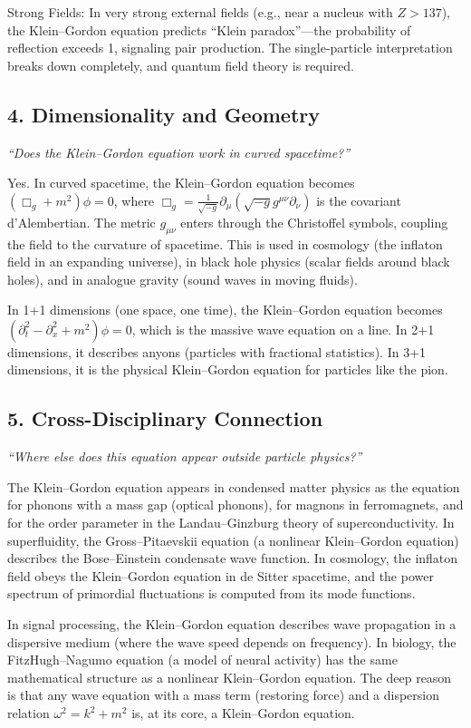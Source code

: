 \documentclass[11pt,openright]{book}
\begin{document}
Strong Fields: In very strong external fields (e.g., near a nucleus with $Z > 137$), the Klein--Gordon equation predicts ``Klein paradox''---the probability of reflection exceeds 1, signaling pair production. The single-particle interpretation breaks down completely, and quantum field theory is required.

\subsection*{4. Dimensionality and Geometry}
\textit{``Does the Klein--Gordon equation work in curved spacetime?''}

Yes. In curved spacetime, the Klein--Gordon equation becomes $(\Box_g + m^2)\phi = 0$, where $\Box_g = \frac{1}{\sqrt{-g}}\partial_\mu(\sqrt{-g}g^{\mu\nu}\partial_\nu)$ is the covariant d'Alembertian. The metric $g_{\mu\nu}$ enters through the Christoffel symbols, coupling the field to the curvature of spacetime. This is used in cosmology (the inflaton field in an expanding universe), in black hole physics (scalar fields around black holes), and in analogue gravity (sound waves in moving fluids).

In 1+1 dimensions (one space, one time), the Klein--Gordon equation becomes $(\partial_t^2 - \partial_x^2 + m^2)\phi = 0$, which is the massive wave equation on a line. In 2+1 dimensions, it describes anyons (particles with fractional statistics). In 3+1 dimensions, it is the physical Klein--Gordon equation for particles like the pion.

\subsection*{5. Cross-Disciplinary Connection}
\textit{``Where else does this equation appear outside particle physics?''}

The Klein--Gordon equation appears in condensed matter physics as the equation for phonons with a mass gap (optical phonons), for magnons in ferromagnets, and for the order parameter in the Landau--Ginzburg theory of superconductivity. In superfluidity, the Gross--Pitaevskii equation (a nonlinear Klein--Gordon equation) describes the Bose--Einstein condensate wave function. In cosmology, the inflaton field obeys the Klein--Gordon equation in de Sitter spacetime, and the power spectrum of primordial fluctuations is computed from its mode functions.

In signal processing, the Klein--Gordon equation describes wave propagation in a dispersive medium (where the wave speed depends on frequency). In biology, the FitzHugh--Nagumo equation (a model of neural activity) has the same mathematical structure as a nonlinear Klein--Gordon equation. The deep reason is that any wave equation with a mass term (restoring force) and a dispersion relation $\omega^2 = k^2 + m^2$ is, at its core, a Klein--Gordon equation.
\end{document}
